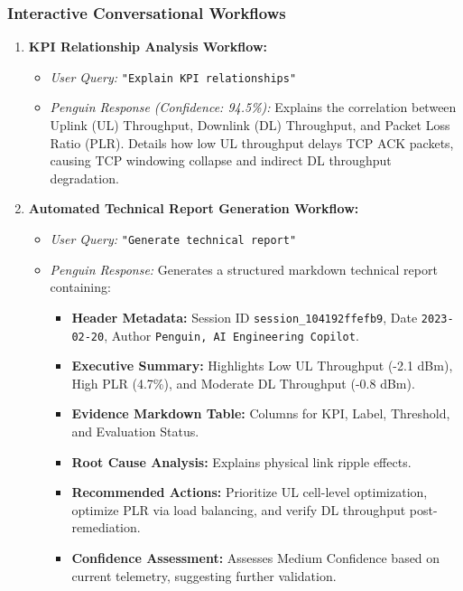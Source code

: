 \documentclass[12pt,a4paper]{report}
\begin{document}
\subsubsection{Interactive Conversational Workflows}
\begin{enumerate}
    \item \textbf{KPI Relationship Analysis Workflow:}
    \begin{itemize}
        \item \textit{User Query:} \texttt{"Explain KPI relationships"}
        \item \textit{Penguin Response (Confidence: 94.5\%):} Explains the correlation between Uplink (UL) Throughput, Downlink (DL) Throughput, and Packet Loss Ratio (PLR). Details how low UL throughput delays TCP ACK packets, causing TCP windowing collapse and indirect DL throughput degradation.
    \end{itemize}
    \item \textbf{Automated Technical Report Generation Workflow:}
    \begin{itemize}
        \item \textit{User Query:} \texttt{"Generate technical report"}
        \item \textit{Penguin Response:} Generates a structured markdown technical report containing:
        \begin{itemize}
            \item \textbf{Header Metadata:} Session ID \texttt{session\_104192ffefb9}, Date \texttt{2023-02-20}, Author \texttt{Penguin, AI Engineering Copilot}.
            \item \textbf{Executive Summary:} Highlights Low UL Throughput (-2.1 dBm), High PLR (4.7\%), and Moderate DL Throughput (-0.8 dBm).
            \item \textbf{Evidence Markdown Table:} Columns for KPI, Label, Threshold, and Evaluation Status.
            \item \textbf{Root Cause Analysis:} Explains physical link ripple effects.
            \item \textbf{Recommended Actions:} Prioritize UL cell-level optimization, optimize PLR via load balancing, and verify DL throughput post-remediation.
            \item \textbf{Confidence Assessment:} Assesses Medium Confidence based on current telemetry, suggesting further validation.
        \end{itemize}
    \end{itemize}
\end{enumerate}
\end{document}
